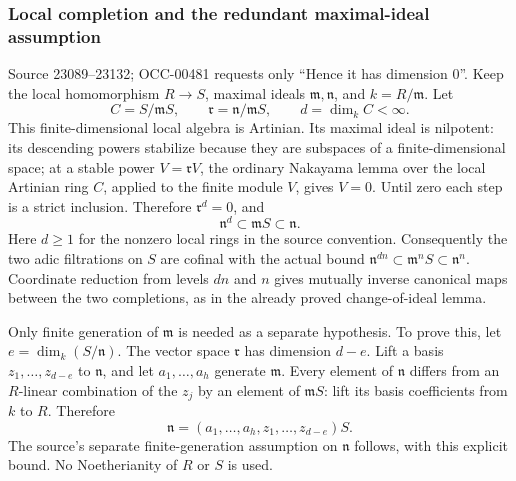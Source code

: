 \subsubsection{Local completion and the redundant maximal-ideal assumption}\label{algebra-proof-015-local-completion-and-the-redundant-maximal-ideal-assumption}

Source 23089--23132; OCC-00481 requests only ``Hence it has dimension 0''. Keep the local homomorphism \(R\to S\), maximal ideals \(\mathfrak m,\mathfrak n\), and \(k=R/\mathfrak m\). Let \[
C=S/\mathfrak mS,\qquad
\mathfrak r=\mathfrak n/\mathfrak mS,\qquad
d=\dim_k C<\infty .
\] This finite-dimensional local algebra is Artinian. Its maximal ideal is nilpotent: its descending powers stabilize because they are subspaces of a finite-dimensional space; at a stable power \(V=\mathfrak rV\), the ordinary Nakayama lemma over the local Artinian ring \(C\), applied to the finite module \(V\), gives \(V=0\). Until zero each step is a strict inclusion. Therefore \(\mathfrak r^d=0\), and \[
\mathfrak n^d\subset\mathfrak mS\subset\mathfrak n.
\] Here \(d\geq1\) for the nonzero local rings in the source convention. Consequently the two adic filtrations on \(S\) are cofinal with the actual bound \(\mathfrak n^{dn}\subset\mathfrak m^nS\subset\mathfrak n^n\). Coordinate reduction from levels \(dn\) and \(n\) gives mutually inverse canonical maps between the two completions, as in the already proved change-of-ideal lemma.

Only finite generation of \(\mathfrak m\) is needed as a separate hypothesis. To prove this, let \(e=\dim_k(S/\mathfrak n)\). The vector space \(\mathfrak r\) has dimension \(d-e\). Lift a basis \(z_1,\ldots,z_{d-e}\) to \(\mathfrak n\), and let \(a_1,\ldots,a_h\) generate \(\mathfrak m\). Every element of \(\mathfrak n\) differs from an \(R\)-linear combination of the \(z_j\) by an element of \(\mathfrak mS\): lift its basis coefficients from \(k\) to \(R\). Therefore \[
\mathfrak n=(a_1,\ldots,a_h,z_1,\ldots,z_{d-e})S .
\] The source's separate finite-generation assumption on \(\mathfrak n\) follows, with this explicit bound. No Noetherianity of \(R\) or \(S\) is used.

